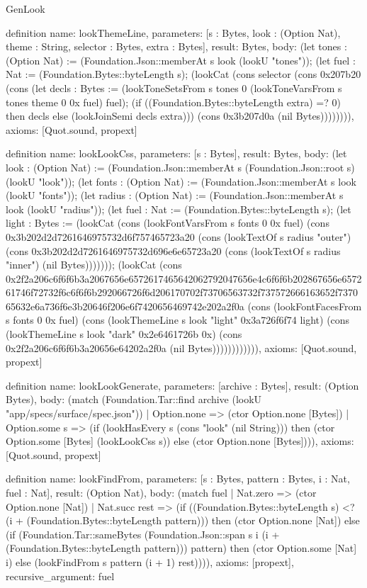 \begin{lexlean}{GenLook}
\begin{semanticmodule}
definition{
  name: lookThemeLine,
  parameters: [s : Bytes, look : (Option Nat), theme : String, selector : Bytes, extra : Bytes],
  result: Bytes,
  body: (let tones : (Option Nat) := (Foundation.Json::memberAt s look (lookU "tones")); (let fuel : Nat := (Foundation.Bytes::byteLength s); (lookCat (cons selector (cons 0x207b20 (cons (let decls : Bytes := (lookToneSetsFrom s tones 0 (lookToneVarsFrom s tones theme 0 0x fuel) fuel); (if ((Foundation.Bytes::byteLength extra) =? 0) then decls else (lookJoinSemi decls extra))) (cons 0x3b207d0a (nil Bytes)))))))),
  axioms: [Quot.sound, propext]
}

definition{
  name: lookLookCss,
  parameters: [s : Bytes],
  result: Bytes,
  body: (let look : (Option Nat) := (Foundation.Json::memberAt s (Foundation.Json::root s) (lookU "look")); (let fonts : (Option Nat) := (Foundation.Json::memberAt s look (lookU "fonts")); (let radius : (Option Nat) := (Foundation.Json::memberAt s look (lookU "radius")); (let fuel : Nat := (Foundation.Bytes::byteLength s); (let light : Bytes := (lookCat (cons (lookFontVarsFrom s fonts 0 0x fuel) (cons 0x3b202d2d7261646975732d6f757465723a20 (cons (lookTextOf s radius "outer") (cons 0x3b202d2d7261646975732d696e6e65723a20 (cons (lookTextOf s radius "inner") (nil Bytes))))))); (lookCat (cons 0x2f2a206c6f6f6b3a2067656e6572617465642062792047656e4c6f6f6b202867656e657261746f72732f6c6f6f6b292066726f6d206170702f73706563732f737572666163652f737065632e6a736f6e3b20646f206e6f7420656469742e202a2f0a (cons (lookFontFacesFrom s fonts 0 0x fuel) (cons (lookThemeLine s look "light" 0x3a726f6f74 light) (cons (lookThemeLine s look "dark" 0x2e6461726b 0x) (cons 0x2f2a206c6f6f6b3a20656e64202a2f0a (nil Bytes)))))))))))),
  axioms: [Quot.sound, propext]
}

definition{
  name: lookLookGenerate,
  parameters: [archive : Bytes],
  result: (Option Bytes),
  body: (match (Foundation.Tar::find archive (lookU "app/specs/surface/spec.json"))
    | Option.none => (ctor Option.none [Bytes])
    | Option.some s => (if (lookHasEvery s (cons "look" (nil String))) then (ctor Option.some [Bytes] (lookLookCss s)) else (ctor Option.none [Bytes]))),
  axioms: [Quot.sound, propext]
}

definition{
  name: lookFindFrom,
  parameters: [s : Bytes, pattern : Bytes, i : Nat, fuel : Nat],
  result: (Option Nat),
  body: (match fuel
    | Nat.zero => (ctor Option.none [Nat])
    | Nat.succ rest => (if ((Foundation.Bytes::byteLength s) <? (i + (Foundation.Bytes::byteLength pattern))) then (ctor Option.none [Nat]) else (if (Foundation.Tar::sameBytes (Foundation.Json::span s i (i + (Foundation.Bytes::byteLength pattern))) pattern) then (ctor Option.some [Nat] i) else (lookFindFrom s pattern (i + 1) rest)))),
  axioms: [propext],
  recursive_argument: fuel
}


\end{semanticmodule}
\end{lexlean}
